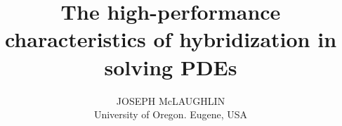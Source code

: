 \title{The high-performance characteristics of hybridization in solving PDEs}
\author{\small{JOSEPH McLAUGHLIN}\\ University of Oregon. Eugene, USA}